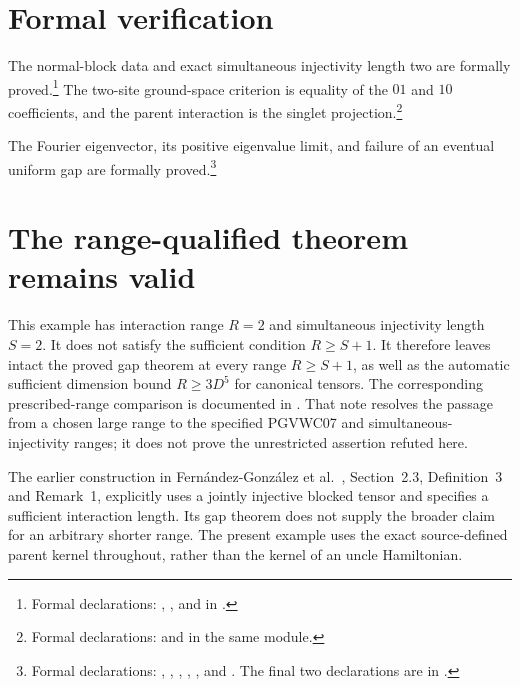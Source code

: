\documentclass{article}
\begin{document}
\section{Formal verification}

The normal-block data and exact simultaneous injectivity length two are
formally proved.\footnote{Formal declarations:
    ,
    , and
    in .}
The two-site ground-space criterion is equality of the $01$ and $10$
coefficients, and the parent interaction is the singlet projection.\footnote{Formal declarations:
     and
    in the same module.}

The Fourier eigenvector, its positive eigenvalue limit, and failure of an
eventual uniform gap are formally proved.\footnote{Formal declarations:
    ,
    ,
    ,
    ,
    , and
    .
    The final two declarations are in
    .}

\section{The range-qualified theorem remains valid}

This example has interaction range $R=2$ and simultaneous injectivity
length $S=2$. It does not satisfy the sufficient condition $R\geq S+1$.
It therefore leaves intact the proved gap theorem at every range
$R\geq S+1$, as well as the automatic sufficient dimension bound
$R\geq3D^5$ for canonical tensors. The corresponding prescribed-range
comparison is documented in
.
That note resolves the passage from a chosen large range to the specified
PGVWC07 and simultaneous-injectivity ranges; it does not prove the
unrestricted assertion refuted here.

The earlier construction in
Fern\'andez-Gonz\'alez et al.~\cite{FernandezGonzalez2015Gapless},
Section~2.3, Definition~3 and Remark~1, explicitly
uses a jointly injective blocked tensor and specifies a sufficient
interaction length. Its gap theorem does not supply the broader claim
for an arbitrary shorter range. The present example uses the exact
source-defined parent kernel throughout, rather than the kernel of an
uncle Hamiltonian.



\end{document}
